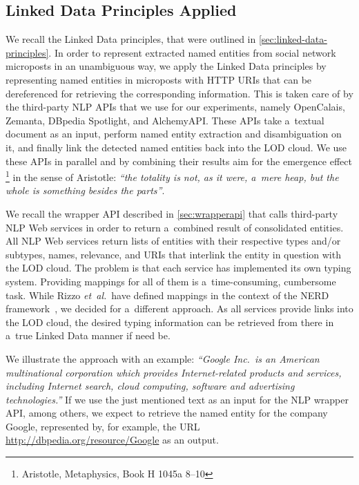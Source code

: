 \subsection{Linked Data Principles Applied}

We recall the Linked Data principles, that were outlined
in \autoref{sec:linked-data-principles}.
In order to represent extracted named entities from
social network microposts in an unambiguous way,
we apply the Linked Data principles
by representing named entities in microposts with HTTP URIs
that can be dereferenced for retrieving the corresponding information.
This is taken care of by the third-party NLP APIs
that we use for our experiments, namely OpenCalais,
Zemanta, DBpedia Spotlight, and AlchemyAPI.
These APIs take a~textual document as an input,
perform named entity extraction and disambiguation on it,
and finally link the detected named entities back
into the LOD cloud.
We use these APIs in parallel and by combining their results
aim for the emergence effect%
\footnote{Aristotle, Metaphysics, Book H 1045a 8--10}
in the sense of Aristotle:
\textit{``the totality is not, as it were, a~mere heap,
but the whole is something besides the
parts''}.

We recall the wrapper API described in \autoref{sec:wrapperapi}
that calls third-party NLP Web services
in order to return a~combined result of consolidated entities.
All NLP Web services return lists of entities with
their respective types and/or subtypes, names,
relevance, and URIs that interlink the entity in question
with the LOD cloud.
The problem is that each service has implemented
its own typing system.
Providing mappings for all of them
is a~time-consuming, cumbersome task.
While Rizzo \emph{et~al.}\ have defined mappings in the context
of the NERD framework~\cite{rizzo2011nerd,rizzo2012nerd},
we decided for a~different approach.
As all services provide links into the LOD cloud,
the desired typing information can be retrieved from there
in a~true Linked Data manner if need be.

We illustrate the approach with an example:
\textit{``Google Inc.\ is an American multinational corporation
which provides Internet-related products and services,
including Internet search, cloud computing, software and 
advertising technologies.''}
If we use the just mentioned text
as an input for the NLP wrapper API,
among others, we expect to retrieve the named entity for the
company Google, represented by, for example, the URL
\url{http://dbpedia.org/resource/Google} as an output.

